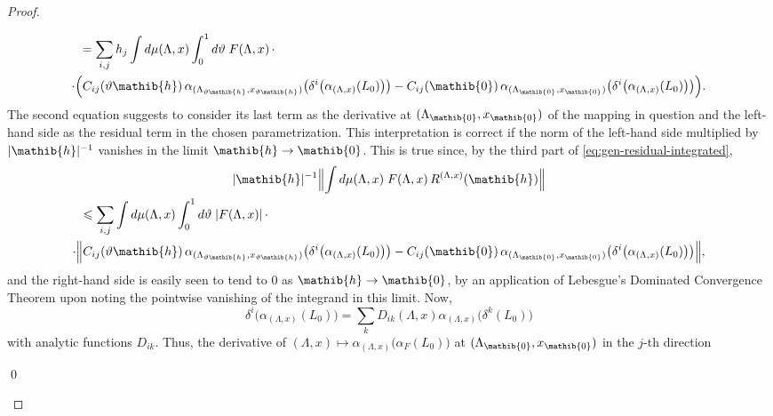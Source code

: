 \documentclass[a4paper,a4paper]{article}
\numberwithin{equation}{section}
\newcommand{\zeroib}{\mathib{0}}
\newcommand{\hib}{\mathib{h}}
\newcommand{\aLax}{\alpha_{( \Lambda , x )}}
\newcounter{proofitem}
\newenvironment{prooflist}{\begin{list}{(\roman{proofitem})}%
  {\usecounter{proofitem} \setlength{\topsep}{0ex}%
   \setlength{\parsep}{0.2ex} \setlength{\itemsep}{0.4ex}%
   \setlength{\leftmargin}{0em} \setlength{\itemindent}{0.5em}%
   \setlength{\listparindent}{1em}}}{\qed \end{list}}
\theoremstyle{definition}
\theoremstyle{plain}
\theoremstyle{remark}
\newcommand{\abs}[1]{\lvert #1 \rvert}
\newcommand{\Bnorm}[1]{\Bigl\lVert #1 \Bigr\rVert}
\begin{document}
\begin{proof}
\begin{prooflist}
\begin{subequations}
\begin{multline}
          \shoveleft{= \sum_{i , j} h_j \int d \mu ( \Lambda , x )
          \int_0^1 d \vartheta \; F ( \Lambda , x ) \, \cdot} \\
          \cdot \Bigl( C_{i j} ( \vartheta \hib ) \,
          \alpha_{( \Lambda_{\vartheta \hib} , x_{\vartheta \hib} )}
          \bigl( \delta^i \bigl( \aLax ( L_0 ) \bigr) \bigr) - C_{i j}
          ( \zeroib ) \, \alpha_{( \Lambda_\zeroib , x_\zeroib )}
          \bigl( \delta^i \bigl( \aLax ( L_0 ) \bigr) \bigr) \Bigr)
          \text{.}
        \end{multline}
      \end{subequations}
      The second equation suggests to consider its last term as the
      derivative at $( \Lambda_\zeroib , x_\zeroib )$ of the mapping
      in question and the left-hand side as the residual term in the
      chosen parametrization. This interpretation is correct if the
      norm of the left-hand side multiplied by $\abs{\hib}^{-1}$
      vanishes in the limit $\hib \rightarrow \zeroib$. This is
      true since, by the third part of
      \eqref{eq:gen-residual-integrated},
      \begin{multline*}
        \abs{\hib}^{-1} \Bnorm{\int d \mu ( \Lambda , x ) \; F (
        \Lambda , x ) \, R^{( \Lambda , x )} ( \hib )} \\
        \shoveleft{\leqslant \sum_{i , j} \int d \mu ( \Lambda , x )
        \int_0^1 d \vartheta \; \abs{F ( \Lambda , x )} \, \cdot} \\
        \cdot \Bnorm{C_{i j} ( \vartheta \hib ) \,
        \alpha_{( \Lambda_{\vartheta \hib} , x_{\vartheta \hib} )}
        \bigl( \delta^i \bigl( \aLax ( L_0 ) \bigr) \bigr) - C_{i j} (
        \zeroib ) \, \alpha_{( \Lambda_\zeroib , x_\zeroib )} \bigl(
        \delta^i \bigl( \aLax ( L_0 ) \bigr) \bigr)} \text{,}
      \end{multline*}
      and the right-hand side is easily seen to tend to $0$ as $\hib
      \rightarrow \zeroib$, by an application of Lebesgue's Dominated
      Convergence Theorem \cite[II.5.6]{fell/doran:1988a} upon noting
      the pointwise vanishing of the integrand in this limit. Now,
      \begin{equation*}
        \delta^i \bigl( \aLax ( L_0 ) \bigr) = \sum_k D_{i k} (
        \Lambda , x ) \aLax \bigl( \delta^k ( L_0 ) \bigr)
      \end{equation*}
      with analytic functions $D_{i k}$. Thus, the derivative of $(
      \Lambda , x ) \mapsto \aLax \bigl( \alpha_F ( L_0 ) \bigr)$ at
      $( \Lambda_\zeroib , x_\zeroib )$ in the $j$-th direction

\end{prooflist}
\end{proof}
\end{document}
